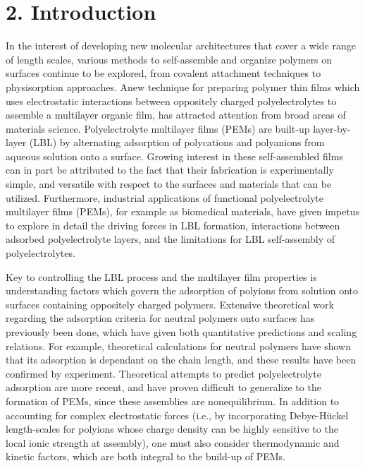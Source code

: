 \documentclass[journal=mamobx,manuscript=article]{achemso}
\begin{document}
\section{2. Introduction}

In the interest of developing new molecular architectures that cover a wide range of length scales, various methods to self-assemble and organize polymers on surfaces continue to be explored, from covalent attachment techniques\cite{doi:10.1002/ijch.199600050,B210143M,doi:10.1002/masy.200450305} to physisorption approaches.\cite{Chen1992,Serizawa2002}  
Anew technique for preparing polymer thin films which uses electrostatic interactions between oppositely charged polyelectrolytes to assemble a multilayer organic film, has attracted attention from broad areas of materials science.\cite{Decher1997}  Polyelectrolyte multilayer films (PEMs) are built-up layer-by-layer (LBL) by alternating adsorption of polycations and polyanions from aqueous solution onto a surface.\cite{Decher2006}  Growing interest in these self-assembled films can in part be attributed to the fact that their fabrication is experimentally simple, and versatile with respect to the surfaces and materials that can be utilized.  Furthermore, industrial applications of functional polyelectrolyte multilayer films (PEMs), for example as biomedical materials, have given impetus to explore in detail the driving forces in LBL formation, interactions between adsorbed polyelectrolyte layers, and the limitations for LBL self-assembly of polyelectrolytes.

Key to controlling the LBL process and the multilayer film properties is understanding factors which govern the adsorption of polyions from solution onto surfaces containing oppositely charged polymers\cite{Schonhoff2003}.  Extensive theoretical work regarding the adsorption criteria for neutral polymers onto surfaces has previously been done, which have given both quantitative predictions\cite{Fleer1982,Baumgartner1991} and scaling relations.\cite{DeGennes1976,Alexander1977}  For example, theoretical calculations for neutral polymers have shown that its adsorption is dependant on the chain length,\cite{Stuart1980} and these results have been confirmed by experiment.\cite{Stuart1980,Felter1970}  
Theoretical attempts to predict polyelectrolyte adsorption are more recent\cite{Szilagyi2014}, and have proven difficult to generalize to the formation of PEMs, since these assemblies are nonequilibrium.  In addition to accounting for complex electrostatic forces (i.e., by incorporating Debye-H\"uckel length-scales for polyions whose charge density can be highly sensitive to the local ionic strength at assembly),\cite{Chatellier1996} one must also consider thermodynamic and kinetic factors, which are both integral to the build-up of PEMs.\cite{Kovacevic2002} 
\end{document}
